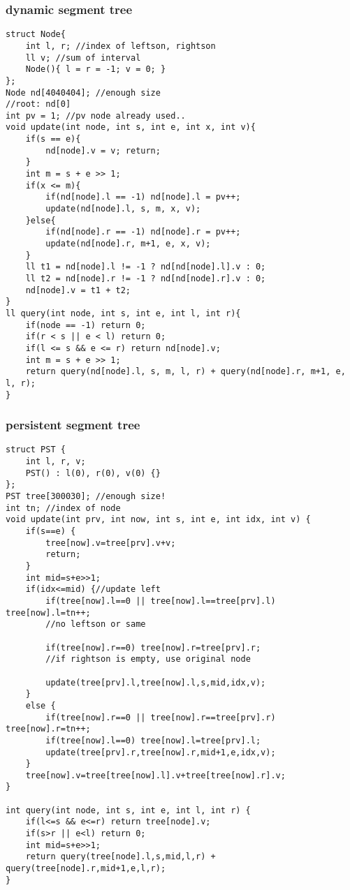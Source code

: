 \documentclass[landscape, 8pt, a4paper, oneside, twocolumn]{extarticle}
\begin{document}
\subsubsection {dynamic segment tree}
\begin{verbatim}
struct Node{
    int l, r; //index of leftson, rightson
    ll v; //sum of interval
    Node(){ l = r = -1; v = 0; }
};
Node nd[4040404]; //enough size
//root: nd[0]
int pv = 1; //pv node already used..
void update(int node, int s, int e, int x, int v){
    if(s == e){
        nd[node].v = v; return;
    }
    int m = s + e >> 1;
    if(x <= m){
        if(nd[node].l == -1) nd[node].l = pv++;
        update(nd[node].l, s, m, x, v);
    }else{
        if(nd[node].r == -1) nd[node].r = pv++;
        update(nd[node].r, m+1, e, x, v);
    }
    ll t1 = nd[node].l != -1 ? nd[nd[node].l].v : 0;
    ll t2 = nd[node].r != -1 ? nd[nd[node].r].v : 0;
    nd[node].v = t1 + t2;
}
ll query(int node, int s, int e, int l, int r){
    if(node == -1) return 0;
    if(r < s || e < l) return 0;
    if(l <= s && e <= r) return nd[node].v;
    int m = s + e >> 1;
    return query(nd[node].l, s, m, l, r) + query(nd[node].r, m+1, e, l, r);
}
\end{verbatim}
\newpage
\subsubsection {persistent segment tree}
\begin{verbatim}
struct PST {
    int l, r, v;
    PST() : l(0), r(0), v(0) {}
};
PST tree[300030]; //enough size!
int tn; //index of node
void update(int prv, int now, int s, int e, int idx, int v) {
    if(s==e) {
        tree[now].v=tree[prv].v+v;
        return;
    }
    int mid=s+e>>1;
    if(idx<=mid) {//update left
        if(tree[now].l==0 || tree[now].l==tree[prv].l) tree[now].l=tn++;
		//no leftson or same
        
        if(tree[now].r==0) tree[now].r=tree[prv].r;
		//if rightson is empty, use original node
        
        update(tree[prv].l,tree[now].l,s,mid,idx,v);
    }
    else {
        if(tree[now].r==0 || tree[now].r==tree[prv].r) tree[now].r=tn++;
        if(tree[now].l==0) tree[now].l=tree[prv].l;
        update(tree[prv].r,tree[now].r,mid+1,e,idx,v);
    }
    tree[now].v=tree[tree[now].l].v+tree[tree[now].r].v;
}

int query(int node, int s, int e, int l, int r) {
    if(l<=s && e<=r) return tree[node].v;
    if(s>r || e<l) return 0;
    int mid=s+e>>1;
    return query(tree[node].l,s,mid,l,r) + query(tree[node].r,mid+1,e,l,r);
}
\end{verbatim}
\newpage
\end{document}
